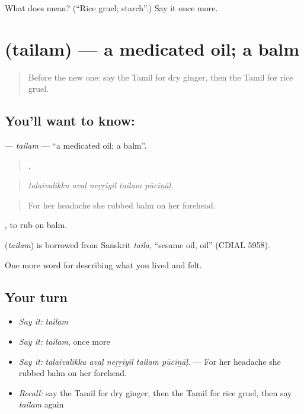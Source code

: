 \begin{tcolorbox}[breakable,colback=teal!4,colframe=teal!35!black,title={Before you move on}]
What does  mean? (\textquotedblleft{}Rice gruel; starch\textquotedblright{}.) Say it once more.
\end{tcolorbox}
\section[\texorpdfstring{\ta{தைலம்} (tailam)}{தைலம் (tailam)}]{ (tailam) — a medicated oil; a balm}

\label{lesson:TA-C485-tailam}



\begin{quote}
Before the new one: say the Tamil for dry ginger, then the Tamil for rice gruel.
\end{quote}

\subsection*{You'll want to know: }
\textbf{} — \emph{tailam} — \textquotedblleft{}a medicated oil; a balm\textquotedblright{}.

\begin{quote}
    .
\end{quote}

\begin{quote}
\emph{talaivalikku avaḷ neṟṟiyil tailam pūciṉāḷ.}
\end{quote}

\begin{quote}
For her headache she rubbed balm on her forehead.
\end{quote}

 , to rub on balm.

\begin{cousinweb}
\textbf{} (\emph{tailam}) is borrowed from Sanskrit \emph{taila}, \textquotedblleft{}sesame oil, oil\textquotedblright{} (CDIAL 5958).
\end{cousinweb}

\begin{grammarlens}[title={What you've built}]
One more word for describing what you lived and felt.
\end{grammarlens}

\subsection*{Your turn}
\begin{itemize}
\raggedright
  \item \emph{Say it:} \emph{tailam}
  \item \emph{Say it:} \emph{tailam}, once more
  \item \emph{Say it:} \emph{talaivalikku avaḷ neṟṟiyil tailam pūciṉāḷ.} — For her headache she rubbed balm on her forehead.
  \item \emph{Recall:} say the Tamil for dry ginger, then the Tamil for rice gruel, then say \emph{tailam} again
\end{itemize}


